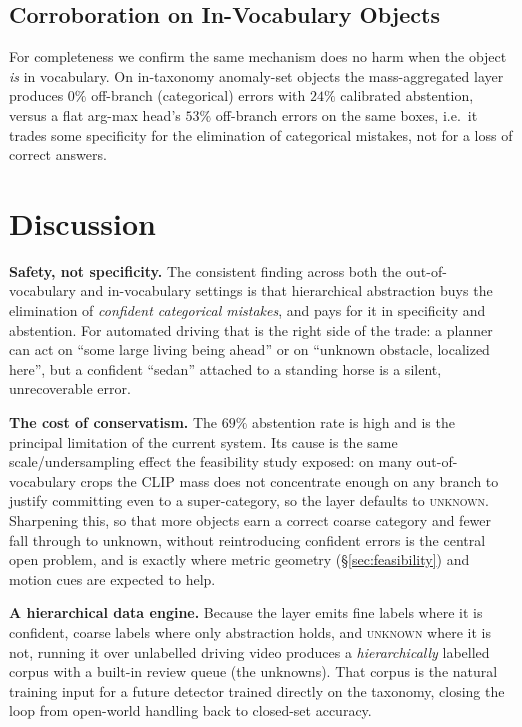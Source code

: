 \documentclass[conference]{IEEEtran}
\begin{document}
\subsection{Corroboration on In-Vocabulary Objects}
For completeness we confirm the same mechanism does no harm when the object \emph{is}
in vocabulary. On in-taxonomy anomaly-set objects the mass-aggregated layer produces
$0\%$ off-branch (categorical) errors with $24\%$ calibrated abstention, versus a
flat arg-max head's $53\%$ off-branch errors on the same boxes, i.e.\ it trades some
specificity for the elimination of categorical mistakes, not for a loss of correct
answers.

\section{Discussion}
\textbf{Safety, not specificity.} The consistent finding across both the
out-of-vocabulary and in-vocabulary settings is that hierarchical abstraction buys
the elimination of \emph{confident categorical mistakes}, and pays for it in
specificity and abstention. For automated driving that is the right side of the
trade: a planner can act on ``some large living being ahead'' or on ``unknown
obstacle, localized here'', but a confident ``sedan'' attached to a standing horse
is a silent, unrecoverable error.

\textbf{The cost of conservatism.} The $69\%$ abstention rate is high and is the
principal limitation of the current system. Its cause is the same scale/undersampling
effect the feasibility study exposed: on many out-of-vocabulary crops the CLIP mass
does not concentrate enough on any branch to justify committing even to a
super-category, so the layer defaults to \textsc{unknown}. Sharpening this, so that
more objects earn a correct coarse category and fewer fall through to
unknown, without reintroducing confident errors is the central open problem, and is
exactly where metric geometry (\S\ref{sec:feasibility}) and motion cues are expected
to help.

\textbf{A hierarchical data engine.} Because the layer emits fine labels where it is
confident, coarse labels where only abstraction holds, and \textsc{unknown} where it
is not, running it over unlabelled driving video produces a \emph{hierarchically}
labelled corpus with a built-in review queue (the unknowns). That corpus is the
natural training input for a future detector trained directly on the taxonomy,
closing the loop from open-world handling back to closed-set accuracy.
\end{document}
